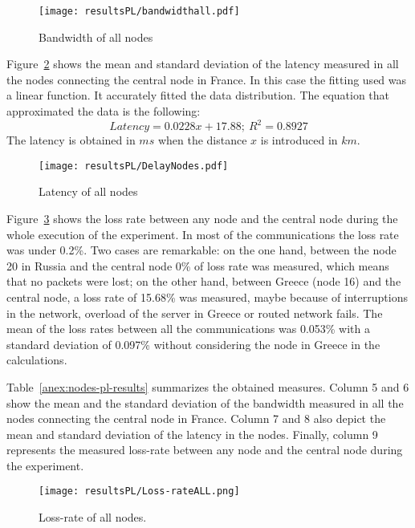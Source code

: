 \begin{center}
\begin{figure}[h]
  \centering
  \texttt{[image: resultsPL/bandwidthall.pdf]}\\
  \caption{Bandwidth of all nodes} \label{fig:bandwidth-plot}
\end{figure}
\end{center}

Figure~\ref{fig:delay-plot} shows the mean and standard
deviation of the latency measured in all the nodes connecting the central node
in France. In this case the fitting used was a linear function. It accurately fitted the data distribution. The equation that approximated the data is the following:
\begin{equation}\label{eq:latency_fitting}
Latency=0.0228x+17.88;~R^2=0.8927
\end{equation}
The latency is obtained in $ms$ when the distance $x$ is introduced in $km$.


\begin{center}
\begin{figure}[h]
  \centering
  \texttt{[image: resultsPL/DelayNodes.pdf]}\\
  \caption{Latency of all nodes} \label{fig:delay-plot}
\end{figure}
\end{center}

Figure~\ref{fig:loss-rate-plot} shows the loss rate between any node and the central node during the whole execution of the experiment. In most of the communications the loss rate was under 0.2\%. Two cases are remarkable: on the one hand, between the node 20 in Russia and the central node 0\% of loss rate was measured, which means that no packets were lost; on the other hand, between Greece (node 16) and the central node, a loss rate of 15.68\% was measured, maybe because of interruptions in the network, overload of the server in Greece or routed network fails. The mean of the loss rates between all the communications was 0.053\% with a standard deviation of 0.097\% without considering the node in Greece in the calculations.

Table~\ref{anex:nodes-pl-results} summarizes the obtained measures. Column 5 and 6 show the mean and
the standard deviation of the bandwidth measured in all the nodes connecting the
central node in France. Column 7 and 8 also depict the mean and standard
deviation of the latency in the nodes. Finally, column 9 represents the measured
loss-rate between any node and the central node during the experiment.




\begin{center}
\begin{figure}[h]
  \centering
  \texttt{[image: resultsPL/Loss-rateALL.png]}\\
  \caption{Loss-rate of all nodes.} \label{fig:loss-rate-plot}
\end{figure}
\end{center}
